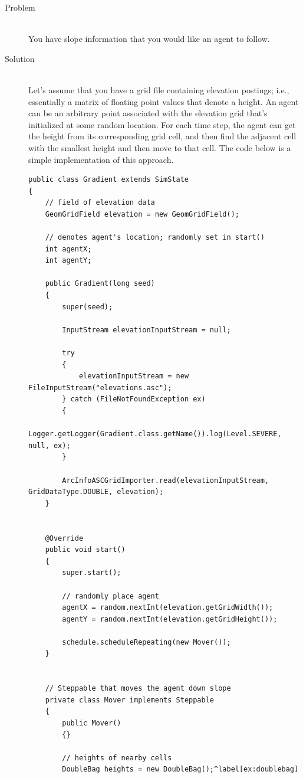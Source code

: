 \documentclass[twoside,10pt]{book}
\begin{document}
\begin{description}
\item[Problem]~\\
You have slope information that you would like an agent to follow.

\item[Solution]~\\
  Let's assume that you have a grid file containing elevation postings;
  i.e., essentially a matrix of floating point values that denote a
  height.  An agent can be an arbitrary point associated with the
  elevation grid that's initialized at some random location.  For each
  time step, the agent can get the height from its corresponding grid
  cell, and then find the adjacent cell with the smallest height and
  then move to that cell.  The code below is a simple implementation
  of this approach.

\begin{Verbatim}[frame=lines,framesep=5mm,commandchars=^\[\]]
public class Gradient extends SimState
{
    // field of elevation data
    GeomGridField elevation = new GeomGridField();

    // denotes agent's location; randomly set in start()
    int agentX;
    int agentY;

    public Gradient(long seed)
    {
        super(seed);

        InputStream elevationInputStream = null;

        try
        {
            elevationInputStream = new FileInputStream("elevations.asc");
        } catch (FileNotFoundException ex)
        {
            Logger.getLogger(Gradient.class.getName()).log(Level.SEVERE, null, ex);
        }

        ArcInfoASCGridImporter.read(elevationInputStream, GridDataType.DOUBLE, elevation);
    }


    @Override
    public void start()
    {
        super.start();

        // randomly place agent
        agentX = random.nextInt(elevation.getGridWidth());
        agentY = random.nextInt(elevation.getGridHeight());

        schedule.scheduleRepeating(new Mover());
    }


    // Steppable that moves the agent down slope
    private class Mover implements Steppable
    {
        public Mover()
        {}

        // heights of nearby cells
        DoubleBag heights = new DoubleBag();^label[ex:doublebag]


\end{Verbatim}
\end{description}
\end{document}

